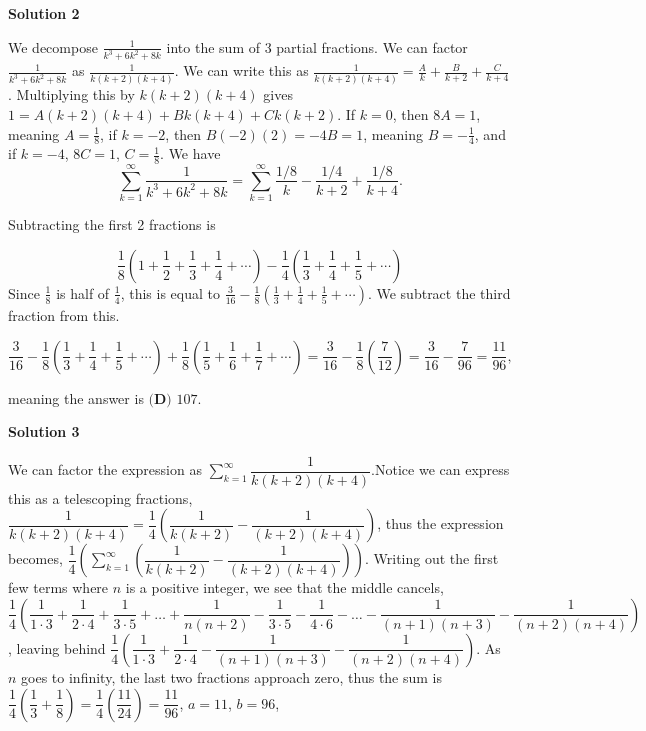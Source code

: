 \begin{enumerate}
 



\textbf{Solution 2}

We decompose $\frac{1}{k^3 + 6k^2 + 8k}$ into the sum of 3 partial fractions. We can factor $\frac{1}{k^3 + 6k^2 + 8k}$ as $\frac{1}{k(k + 2)(k + 4)}$. We can write this as $\frac{1}{k(k + 2)(k + 4)} = \frac{A}{k} + \frac{B}{k + 2} + \frac{C}{k + 4}$. Multiplying this by $k(k + 2)(k + 4)$ gives $1 = A(k + 2)(k + 4) + Bk(k + 4) + Ck(k + 2)$. If $k = 0$, then $8A = 1$, meaning $A = \frac{1}{8}$, if $k = -2$, then $B(-2)(2) = -4B = 1$, meaning $B = -\frac{1}{4}$, and if $k = -4$, $8C = 1$, $C = \frac{1}{8}$. We have 
 \[\sum_{k=1}^{\infty} \frac{1}{k^3 + 6k^2 + 8k} = \sum_{k = 1}^{\infty} \frac{1/8}{k} - \frac{1/4}{k + 2} + \frac{1/8}{k + 4}.\]

 Subtracting the first 2 fractions is 

 
 \[\frac{1}{8} (1 + \frac{1}{2} + \frac{1}{3} + \frac{1}{4} + \cdots) - \frac{1}{4} (\frac{1}{3} + \frac{1}{4} + \frac{1}{5} + \cdots)\]Since $\frac{1}{8}$ is half of $\frac{1}{4}$, this is equal to $\frac{3}{16} - \frac{1}{8} (\frac{1}{3} + \frac{1}{4} + \frac{1}{5} + \cdots)$. We subtract the third fraction from this.

 
 \[\frac{3}{16} - \frac{1}{8} (\frac{1}{3} + \frac{1}{4} + \frac{1}{5} + \cdots) + \frac{1}{8} (\frac{1}{5} + \frac{1}{6} + \frac{1}{7} + \cdots) = \frac{3}{16} - \frac{1}{8} (\frac{7}{12}) = \frac{3}{16} - \frac{7}{96} = \frac{11}{96},\]

 meaning the answer is $\boxed{\textbf{(D) } 107}$.

 


 



\textbf{Solution 3}

We can factor the expression as $\sum_{k = 1}^{\infty} \dfrac{1}{k(k+2)(k+4)}$.Notice we can express this as a telescoping fractions, $\dfrac{1}{k(k+2)(k+4)} = \dfrac{1}{4}\left(\dfrac{1}{k(k+2)}-\dfrac{1}{(k+2)(k+4)}\right)$, thus the expression becomes, $\dfrac{1}{4}\left(\sum_{k = 1}^{\infty} \left(\dfrac{1}{k(k+2)}-\dfrac{1}{(k+2)(k+4)}\right)\right)$. Writing out the first few terms where $n$ is a positive integer, we see that the middle cancels, $\dfrac{1}{4}\left(\dfrac{1}{1\cdot3}+\dfrac{1}{2\cdot4}+\dfrac{1}{3\cdot5}+\dots+\dfrac{1}{n(n+2)}-\dfrac{1}{3\cdot5}-\dfrac{1}{4\cdot6}-\dots-\dfrac{1}{(n+1)(n+3)}-\dfrac{1}{(n+2)(n+4)}\right)$, leaving behind $\dfrac{1}{4}\left(\dfrac{1}{1\cdot3}+\dfrac{1}{2\cdot4}-\dfrac{1}{(n+1)(n+3)}-\dfrac{1}{(n+2)(n+4)}\right)$. As $n$ goes to infinity, the last two fractions approach zero, thus the sum is $\dfrac{1}{4}\left(\dfrac{1}{3}+\dfrac{1}{8}\right) = \dfrac{1}{4}\left(\dfrac{11}{24}\right) = \dfrac{11}{96}$, $a = 11$, $b = 96$, 


\end{enumerate}
